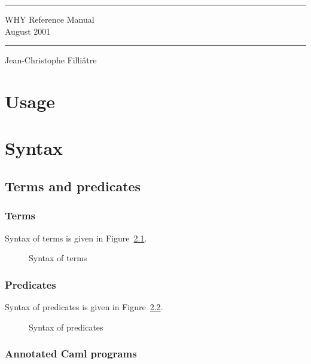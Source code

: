 \documentclass[a4paper,12pt]{report}
\begin{document}
\thispagestyle{empty}
\begin{center}
\vfill
\rule\textwidth{0.1cm}\\[0.3cm]
{\Huge\sf WHY Reference Manual}\\[0.5cm]
{\large August 2001}\\
\rule\textwidth{0.1cm}
\vfill
\noindent Jean-Christophe Filli\^atre
\vfill
\end{center}

\tableofcontents

\chapter{Usage}

\chapter{Syntax}

\section{Terms and predicates}

\subsection{Terms}

Syntax of terms is given in Figure~\ref{fig:terms}.

\begin{figure}[htbp]
\begin{center}
\hrulefill

\hrulefill
\caption{Syntax of terms}
\label{fig:terms}
\end{center}		
\end{figure}

\subsection{Predicates}

Syntax of predicates is given in Figure~\ref{fig:predicates}.

\begin{figure}[htbp]
\begin{center}
\hrulefill

\hrulefill
\caption{Syntax of predicates}
\label{fig:predicates}
\end{center}		
\end{figure}

\subsection{Annotated Caml programs}
\end{document}
